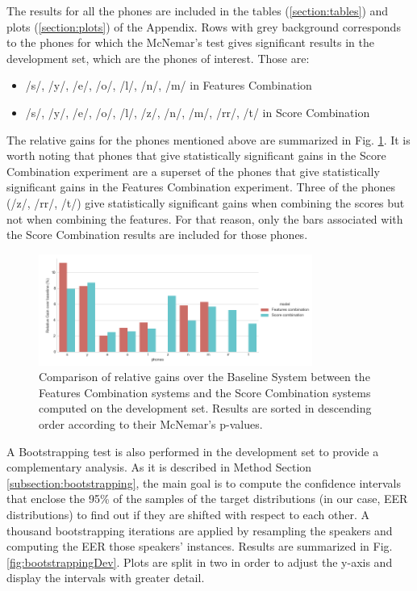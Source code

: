The results for all the phones are included in the tables
(\ref{section:tables}) and plots (\ref{section:plots})
of the Appendix. Rows with grey background corresponds to the phones for which
the McNemar's test gives significant results in the development set, which are the
phones of interest. Those are:

\begin{itemize}
	\item /s/, /y/, /e/, /o/, /l/, /n/, /m/ in Features Combination
	\item /s/, /y/, /e/, /o/, /l/, /z/, /n/, /m/, /rr/, /t/ in Score Combination
\end{itemize}

The relative gains for the phones mentioned above are summarized in
Fig. \ref{fig:fusionMcnemarDev}.
It is worth noting that phones that give statistically significant gains in
the Score Combination experiment are a superset of the phones that give statistically
significant gains in the Features Combination experiment.
Three of the phones (/z/, /rr/, /t/) give statistically significant gains
when combining the scores but not when combining the features.
For that reason, only the bars associated with the Score Combination results are
included for those phones.

\begin{figure}[H]
	\centering
	\includegraphics[width=0.8\textwidth]{files/figures/results/relatives/relatives-fusion-systems-dev-mcnemar.png}
	\caption{Comparison of relative gains over the Baseline System
	between the Features Combination systems
	and the Score Combination systems
	computed on the development set.
	Results are sorted in descending order according to their McNemar's p-values.}
	\label{fig:fusionMcnemarDev}
\end{figure}

A Bootstrapping test is also performed in the development set to provide a complementary
analysis. As it is described in Method Section \ref{subsection:bootstrapping}, the main goal
is to compute the confidence intervals that enclose the 95\% of the samples of
the target distributions (in our case, EER distributions) to find out if they are shifted
with respect to each other. A thousand bootstrapping iterations are applied by resampling
the speakers and computing the EER those speakers' instances. Results are summarized in Fig. \ref{fig:bootstrappingDev}. Plots are split in two in order to adjust the y-axis and display the intervals
with greater detail.

